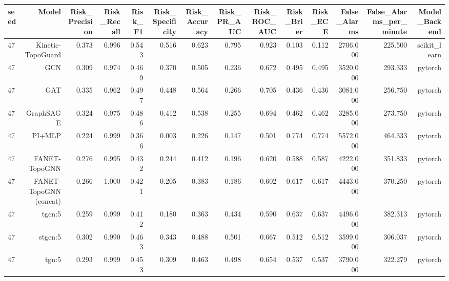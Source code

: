 \begin{tabular}{lrrrrrrrrrrrrr}
\toprule
seed & Model & Risk\_Precision & Risk\_Recall & Risk\_F1 & Risk\_Specificity & Risk\_Accuracy & Risk\_PR\_AUC & Risk\_ROC\_AUC & Risk\_Brier & Risk\_ECE & False\_Alarms & False\_Alarms\_per\_minute & Model\_Backend \\
\midrule
47 & Kinetic-TopoGuard & 0.373 & 0.996 & 0.543 & 0.516 & 0.623 & 0.795 & 0.923 & 0.103 & 0.112 & 2706.000 & 225.500 & scikit\_learn \\
47 & GCN & 0.309 & 0.974 & 0.469 & 0.370 & 0.505 & 0.236 & 0.672 & 0.495 & 0.495 & 3520.000 & 293.333 & pytorch \\
47 & GAT & 0.335 & 0.962 & 0.497 & 0.448 & 0.564 & 0.266 & 0.705 & 0.436 & 0.436 & 3081.000 & 256.750 & pytorch \\
47 & GraphSAGE & 0.324 & 0.975 & 0.486 & 0.412 & 0.538 & 0.255 & 0.694 & 0.462 & 0.462 & 3285.000 & 273.750 & pytorch \\
47 & PI+MLP & 0.224 & 0.999 & 0.366 & 0.003 & 0.226 & 0.147 & 0.501 & 0.774 & 0.774 & 5572.000 & 464.333 & pytorch \\
47 & FANET-TopoGNN & 0.276 & 0.995 & 0.432 & 0.244 & 0.412 & 0.196 & 0.620 & 0.588 & 0.587 & 4222.000 & 351.833 & pytorch \\
47 & FANET-TopoGNN (concat) & 0.266 & 1.000 & 0.421 & 0.205 & 0.383 & 0.186 & 0.602 & 0.617 & 0.617 & 4443.000 & 370.250 & pytorch \\
47 & tgcn:5 & 0.259 & 0.999 & 0.412 & 0.180 & 0.363 & 0.434 & 0.590 & 0.637 & 0.637 & 4496.000 & 382.313 & pytorch \\
47 & stgcn:5 & 0.302 & 0.990 & 0.463 & 0.343 & 0.488 & 0.501 & 0.667 & 0.512 & 0.512 & 3599.000 & 306.037 & pytorch \\
47 & tgn:5 & 0.293 & 0.999 & 0.453 & 0.309 & 0.463 & 0.498 & 0.654 & 0.537 & 0.537 & 3790.000 & 322.279 & pytorch \\
\bottomrule
\end{tabular}